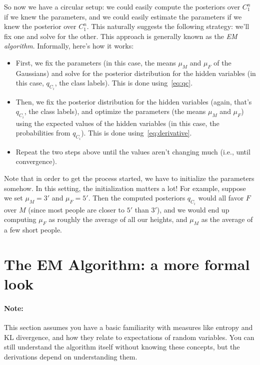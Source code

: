 \documentclass[12pt]{article}
\begin{document}
    So now we have a circular setup: we could easily compute the posteriors
    over $C_1^n$ if we knew the parameters, and we could easily estimate the
    parameters if we knew the posterior over $C_1^n$. This naturally suggests
    the following strategy: we'll fix one and solve for the other.  This
    approach is generally known as the \emph{EM algorithm}. Informally, here's
    how it works:
    \begin{itemize}
        \item First, we fix the parameters (in this case, the means $\mu_M$ and $\mu_F$ of
            the Gaussians) and solve for the posterior distribution for the hidden
            variables (in this case, $q_{C_i}$, the class labels). This is done
            using~\eqref{eq:qc}.
        \item Then, we fix the posterior distribution for the hidden variables
            (again, that's $q_{C_i}$, the class labels), and optimize the
            parameters (the means $\mu_M$ and $\mu_F$) using the expected
            values of the hidden variables (in this case, the probabilities
            from $q_{C_i}$). This is done using~\eqref{eq:derivative}.
        \item Repeat the two steps above until the values aren't changing much
            (i.e., until convergence).
    \end{itemize}
    Note that in order to get the process started, we have to initialize the
    parameters somehow. In this setting, the initialization matters a lot! For
    example, suppose we set $\mu_M = 3'$ and $\mu_F = 5'$. Then the computed
    posteriors $q_{C_i}$ would all favor $F$ over $M$ (since most people are
    closer to $5'$ than $3'$), and we would end up computing $\mu_F$ as roughly
    the average of all our heights, and $\mu_M$ as the average of a few short
    people.

    \pagebreak
    \section{The EM Algorithm: a more formal look}
    \label{sec:EM}

    \paragraph{\textbf{Note:}} This section assumes you have a basic
    familiarity with measures like entropy and KL divergence, and how they
    relate to expectations of random variables. You can still understand the
    algorithm itself without knowing these concepts, but the derivations depend
    on understanding them.
\end{document}
